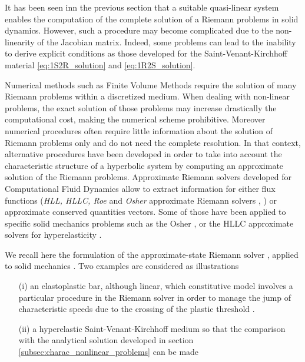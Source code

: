 It has been seen inn the previous section that a suitable quasi-linear system enables the computation of the complete solution of a Riemann problems in solid dynamics. However, such a procedure may become complicated due to the non-linearity of the Jacobian matrix. Indeed, some problems can lead to the inability to derive explicit conditions as those developed for the Saint-Venant-Kirchhoff material \eqref{eq:1S2R_solution} and \eqref{eq:1R2S_solution}.

Numerical methods such as Finite Volume Methods \cite{Leveque} require the solution of many Riemann problems within a discretized medium. When dealing with non-linear problems, the exact solution of those problems may increase drastically the computational cost, making the numerical scheme prohibitive. Moreover numerical procedures often require little information about the solution of Riemann problems only and do not need the complete resolution. In that context, alternative procedures have been developed in order to take into account the characteristic structure of a hyperbolic system by computing an approximate solution of the Riemann problems. Approximate Riemann solvers developed for Computational Fluid Dynamics allow to extract information for either flux functions (\textit{HLL, HLLC, Roe} and \textit{Osher} approximate Riemann solvers \cite{Trangenstein}, \cite{Toro}) or approximate conserved quantities vectors. Some of those have been applied to specific solid mechanics problems such as the Osher \cite{LEE_FVM}, \cite{Haider_FVM} or the HLLC \cite{Ortega_HLLD} approximate solvers for hyperelasticity .

We recall here the formulation of the approximate-state Riemann solver \cite[Ch.9]{Toro}, applied to solid mechanics \cite[Ch.22]{Leveque}. Two examples are considered as illustrations
\begin{itemize}
\item[(i)] an elastoplastic bar, although linear, which constitutive model involves a particular procedure in the Riemann solver in order to manage the jump of characteristic speeds due to the crossing of the plastic threshold \cite{Fogarty}.
\item[(ii)] a hyperelastic Saint-Venant-Kirchhoff medium so that the comparison with the analytical solution developed in section \ref{subsec:charac_nonlinear_problems} can be made
\end{itemize}



